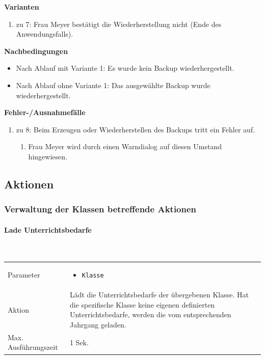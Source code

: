 \documentclass[fontsize=12pt,paper=a4,twoside]{scrartcl}
\begin{document}
\textbf{Varianten}\\
\begin{enumerate}
\item zu 7: Frau Meyer bestätigt die Wiederherstellung nicht (Ende des Anwendungsfalls).
\end{enumerate}
\vspace{5pt}

\textbf{Nachbedingungen}
\begin{itemize}
\item Nach Ablauf mit Variante 1: Es wurde kein Backup wiederhergestellt.
\item Nach Ablauf ohne Variante 1: Das ausgewählte Backup wurde wiederhergestellt.
\end{itemize}
\vspace{5pt}

\textbf{Fehler-/Ausnahmefälle}\\
\begin{enumerate}
\item zu 8: Beim Erzeugen oder Wiederherstellen des Backups tritt ein Fehler auf.
	\begin{enumerate}[label=\arabic*.]
	\item Frau Meyer wird durch einen Warndialog auf diesen Umstand hingewiesen.
	\end{enumerate}
\end{enumerate}


\subsection{Aktionen}

\subsubsection{Verwaltung der Klassen betreffende Aktionen}

\paragraph{Lade Unterrichtsbedarfe}\mbox{}\\

\begin{tabularx}{\textwidth}{p{4cm}X}
Parameter & \begin{itemize}[itemsep=0pt, leftmargin = 0.5cm]
			\item \texttt{Klasse}
			\end{itemize}\\
Aktion & Lädt die Unterrichtsbedarfe der übergebenen Klasse. Hat die spezifische Klasse keine eigenen definierten Unterrichtsbedarfe, werden die vom entsprechenden Jahrgang geladen.\\
Max. Ausführungszeit & 1 Sek. 
\end{tabularx}\\
\end{document}
